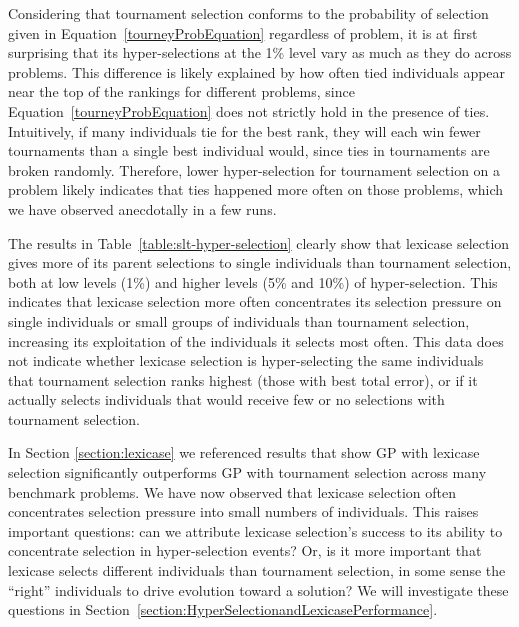 \documentclass{sig-alternate}
\begin{document}

Considering that tournament selection conforms to the probability of selection given in Equation~\ref{tourneyProbEquation} regardless of problem, it is at first surprising that its hyper-selections at the 1\% level vary as much as they do across problems. This difference is likely explained by how often tied individuals appear near the top of the rankings for different problems, since Equation~\ref{tourneyProbEquation} does not strictly hold in the presence of ties. Intuitively, if many individuals tie for the best rank, they will each win fewer tournaments than a single best individual would, since ties in tournaments are broken randomly. Therefore, lower hyper-selection for tournament selection on a problem likely indicates that ties happened more often on those problems, which we have observed anecdotally in a few runs.


The results in Table~\ref{table:slt-hyper-selection} clearly show that lexicase selection gives more of its parent selections to single individuals than tournament selection, both at low levels (1\%) and higher levels (5\% and 10\%) of hyper-selection. This indicates that lexicase selection more often concentrates its selection pressure on single individuals or small groups of individuals than tournament selection, increasing its exploitation of the individuals it selects most often. This data does not indicate whether lexicase selection is hyper-selecting the same individuals that tournament selection ranks highest (those with best total error), or if it actually selects individuals that would receive few or no selections with tournament selection.

In Section \ref{section:lexicase} we referenced results that show GP with lexicase selection significantly outperforms GP with tournament selection across many benchmark problems. We have now observed that lexicase selection often concentrates selection pressure into small numbers of individuals. This raises important questions: can we attribute lexicase selection's success to its ability to concentrate selection in hyper-selection events? Or, is it more important that lexicase selects different individuals than tournament selection, in some sense the ``right'' individuals to drive evolution toward a solution? We will investigate these questions in Section~\ref{section:HyperSelectionandLexicasePerformance}.
\end{document}
